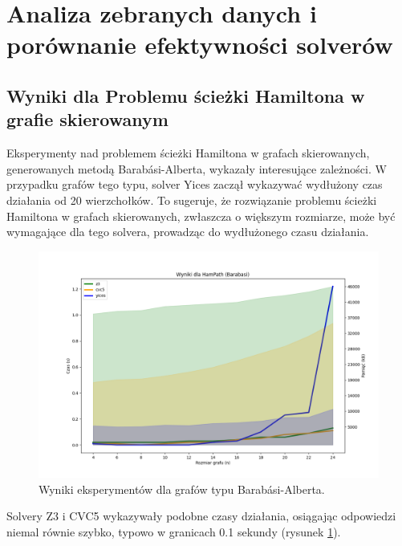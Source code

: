 


\section{Analiza zebranych danych i porównanie efektywności solverów}

\subsection{Wyniki dla Problemu ścieżki Hamiltona w grafie skierowanym}

Eksperymenty nad problemem ścieżki Hamiltona w grafach skierowanych, generowanych metodą Barabási-Alberta, wykazały interesujące zależności. W przypadku grafów tego typu, solver Yices zaczął wykazywać wydłużony czas działania od 20 wierzchołków. To sugeruje, że rozwiązanie problemu ścieżki Hamiltona w grafach skierowanych, zwłaszcza o większym rozmiarze, może być wymagające dla tego solvera, prowadząc do wydłużonego czasu działania.

\begin{figure}[htbp]
	\centering
	\begin{minipage}{\textwidth}
		\includegraphics[width=\textwidth]{./figures/1-barabasi-plot.png}
		\caption{Wyniki eksperymentów dla grafów typu Barabási-Alberta.}
		\label{fig:1-barabasi-plot}
	\end{minipage}
\end{figure}

Solvery Z3 i CVC5 wykazywały podobne czasy działania, osiągając odpowiedzi niemal równie szybko, typowo w granicach 0.1 sekundy (rysunek \ref{fig:1-barabasi-plot}). 

